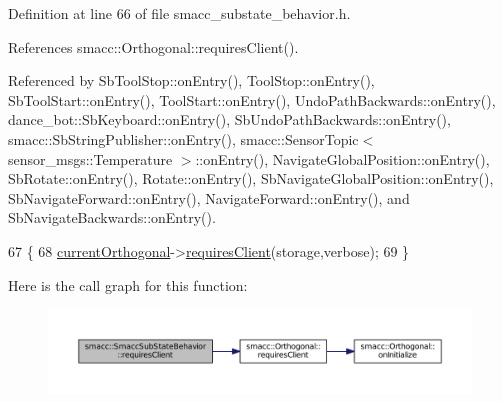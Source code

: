 Definition at line 66 of file smacc\+\_\+substate\+\_\+behavior.\+h.



References smacc\+::\+Orthogonal\+::requires\+Client().



Referenced by Sb\+Tool\+Stop\+::on\+Entry(), Tool\+Stop\+::on\+Entry(), Sb\+Tool\+Start\+::on\+Entry(), Tool\+Start\+::on\+Entry(), Undo\+Path\+Backwards\+::on\+Entry(), dance\+\_\+bot\+::\+Sb\+Keyboard\+::on\+Entry(), Sb\+Undo\+Path\+Backwards\+::on\+Entry(), smacc\+::\+Sb\+String\+Publisher\+::on\+Entry(), smacc\+::\+Sensor\+Topic$<$ sensor\+\_\+msgs\+::\+Temperature $>$\+::on\+Entry(), Navigate\+Global\+Position\+::on\+Entry(), Sb\+Rotate\+::on\+Entry(), Rotate\+::on\+Entry(), Sb\+Navigate\+Global\+Position\+::on\+Entry(), Sb\+Navigate\+Forward\+::on\+Entry(), Navigate\+Forward\+::on\+Entry(), and Sb\+Navigate\+Backwards\+::on\+Entry().


\begin{DoxyCode}
67     \{
68         \hyperlink{classsmacc_1_1SmaccSubStateBehavior_a40aac919bb306d95838fdfcc34cfe391}{currentOrthogonal}->\hyperlink{classsmacc_1_1Orthogonal_af6f6d9cc5bf5433f5fe3b640a6a0b8aa}{requiresClient}(storage,verbose);
69     \}
\end{DoxyCode}


Here is the call graph for this function\+:
\nopagebreak
\begin{figure}[H]
\begin{center}
\leavevmode
\includegraphics[width=350pt]{classsmacc_1_1SmaccSubStateBehavior_ae8361a9e794b02f9f3d962b881e4fd7d_cgraph}
\end{center}
\end{figure}




